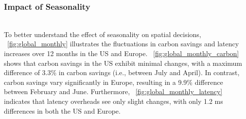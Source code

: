 


\subsubsection{Impact of Seasonality}\label{sec:eval_seasonality}\hfill\\
To better understand the effect of seasonality on spatial decisions, ~\autoref{fig:global_monthly} illustrates the fluctuations in carbon savings and latency increases over 12 months in the US and Europe. ~\autoref{fig:global_monthly_carbon} shows that carbon savings in the US exhibit minimal changes, with a maximum difference of 3.3\% in carbon savings (i.e., between July and April). In contrast, carbon savings vary significantly in Europe, resulting in a 9.9\% difference between February and June. Furthermore, ~\autoref{fig:global_monthly_latency} indicates that latency overheads see only slight changes, with only 1.2 ms differences in both the US and Europe.


